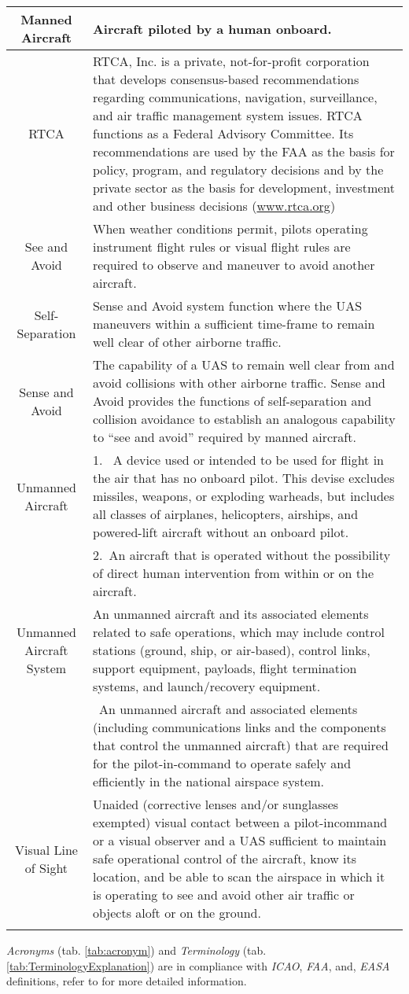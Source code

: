 \begin{tabularx}{\textwidth}{S{0.22}|X}
     Manned Aircraft & Aircraft piloted by a human onboard.\\\hline
     RTCA & RTCA, Inc. is a private, not-for-profit corporation that develops consensus-based recommendations regarding communications, navigation, surveillance, and air traffic management system issues. RTCA functions as a Federal Advisory Committee. Its recommendations are used by the FAA as the basis for policy, program, and regulatory decisions and by the private sector as the basis for development, investment and other business decisions  (\url{www.rtca.org})\\\hline
     See and Avoid & When weather conditions permit, pilots operating instrument flight rules or visual flight rules are required to observe and maneuver to avoid another aircraft. \\\hline
     Self-Separation & Sense and Avoid system function where the UAS maneuvers within a sufficient time-frame to remain well clear of other airborne traffic.\\\hline 
     Sense and Avoid & The capability of a UAS to remain well clear from and avoid collisions with other airborne traffic. Sense and Avoid provides the functions of self-separation and collision avoidance to establish an analogous capability to “see and avoid” required by manned aircraft.\\\hline
     Unmanned Aircraft & 1.~ A device used or intended to be used for flight in the air that has no onboard pilot. This devise excludes missiles, weapons, or exploding warheads, but includes all classes of airplanes, helicopters, airships, and powered-lift aircraft without an onboard pilot.\\
     &2.~An aircraft that is operated without the possibility of direct human intervention from within or on the aircraft.\\\hline
     Unmanned Aircraft System & An unmanned aircraft and its associated elements related to safe operations, which may include control stations (ground, ship, or air-based), control links, support equipment, payloads, flight termination systems, and launch/recovery equipment.\\
     &~An unmanned aircraft and associated elements (including communications links and the components that control the unmanned aircraft) that are required for the pilot-in-command to operate safely and efficiently in the national airspace system. \\\hline
     Visual Line of Sight & Unaided (corrective lenses and/or sunglasses exempted) visual contact between a pilot-incommand or a visual observer and a UAS sufficient to maintain safe operational control of the aircraft, know its location, and be able to scan the airspace in which it is operating to see and avoid other air traffic or objects aloft or on the ground.\\
     \caption{Terminology}
     \label{tab:TerminologyExplanation}
\end{tabularx}

\begin{note}
\emph{Acronyms} (tab. \ref{tab:acronym}) and \emph{Terminology} (tab. \ref{tab:TerminologyExplanation}) are in compliance with \emph{ICAO}, \emph{FAA}, and, \emph{EASA} definitions, refer to  \cite{huerta2013integration} for more detailed information.
\end{note}